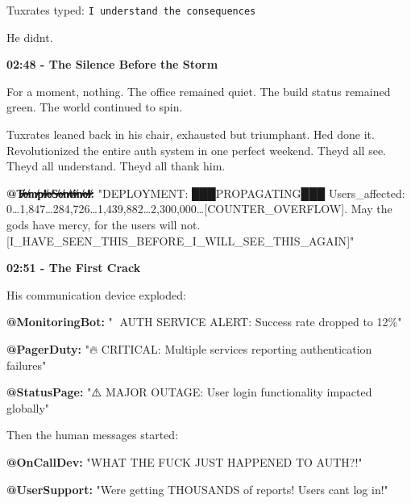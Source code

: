 Tuxrates typed: \texttt{I\ understand\ the\ consequences}

He didn\textquotesingle t.


\textbf{02:48 - The Silence Before the Storm}

For a moment, nothing. The office remained quiet. The build status remained green. The world continued to spin.

Tuxrates leaned back in his chair, exhausted but triumphant. He\textquotesingle d done it. Revolutionized the entire auth system in one perfect weekend. They\textquotesingle d all see. They\textquotesingle d all understand. They\textquotesingle d all thank him.

\textbf{@T̵̸̷̶̵̸̷̶e̵̸̷̶m̵̸̷̶p̵̸̷̶l̵̸̷̶e̵̸̷̶S̵̸̷̶e̵̸̷̶n̵̸̷̶t̵̸̷̶i̵̸̷̶n̵̸̷̶e̵̸̷̶l̵̸̷̶:} "DEPLOYMENT: ███PROPAGATING███ Users\_affected: 0\ldots1,847\ldots284,726\ldots1,439,882\ldots2,300,000\ldots{[}COUNTER\_OVERFLOW{]}. May the gods have mercy, for the users will not. {[}I\_HAVE\_SEEN\_THIS\_BEFORE\_I\_WILL\_SEE\_THIS\_AGAIN{]}"

\textbf{02:51 - The First Crack}

His communication device exploded:

\textbf{@MonitoringBot:} "🚨 AUTH SERVICE ALERT: Success rate dropped to 12\%"

\textbf{@PagerDuty:} "🔥 CRITICAL: Multiple services reporting authentication failures"

\textbf{@StatusPage:} "⚠️ MAJOR OUTAGE: User login functionality impacted globally"

Then the human messages started:

\textbf{@OnCallDev:} "WHAT THE FUCK JUST HAPPENED TO AUTH?!"

\textbf{@UserSupport:} "We\textquotesingle re getting THOUSANDS of reports! Users can\textquotesingle t log in!"

